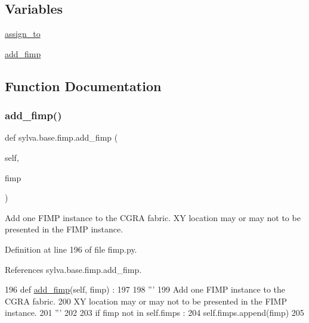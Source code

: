 \subsection*{Variables}
\begin{DoxyCompactItemize}
\item 
\hyperlink{namespacesylva_1_1base_1_1fimp_aa034443ad56b50c50310f6cc6753e52b}{assign\+\_\+to}
\item 
\hyperlink{namespacesylva_1_1base_1_1fimp_a82bf900d1f19a23480ce25d4055fa3d3}{add\+\_\+fimp}
\end{DoxyCompactItemize}


\subsection{Function Documentation}
\mbox{\label{namespacesylva_1_1base_1_1fimp_a33d5ea52e7780ea1d4f0df718eab4ff2}} 
\subsubsection{\texorpdfstring{add\+\_\+fimp()}{add\_fimp()}}
{\footnotesize\ttfamily def sylva.\+base.\+fimp.\+add\+\_\+fimp (\begin{DoxyParamCaption}\item[{}]{self,  }\item[{}]{fimp }\end{DoxyParamCaption})}

\begin{DoxyVerb}  Add one FIMP instance to the CGRA fabric.
  XY location may or may not to be presented in the FIMP instance.
\end{DoxyVerb}
 

Definition at line 196 of file fimp.\+py.



References sylva.\+base.\+fimp.\+add\+\_\+fimp.


\begin{DoxyCode}
196   \textcolor{keyword}{def }\hyperlink{namespacesylva_1_1base_1_1fimp_a33d5ea52e7780ea1d4f0df718eab4ff2}{add\_fimp}(self, fimp) :
197 
198     \textcolor{stringliteral}{'''}
199 \textcolor{stringliteral}{      Add one FIMP instance to the CGRA fabric.}
200 \textcolor{stringliteral}{      XY location may or may not to be presented in the FIMP instance.}
201 \textcolor{stringliteral}{    '''}
202 
203     \textcolor{keywordflow}{if} fimp \textcolor{keywordflow}{not} \textcolor{keywordflow}{in} self.fimps :
204       self.fimps.append(fimp)
205 
\end{DoxyCode}
\mbox{\label{namespacesylva_1_1base_1_1fimp_ad6282a735b53c953ed8ac941c4dbf17a}} 
